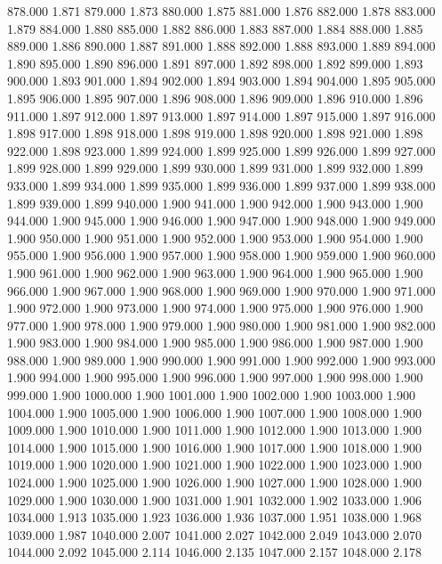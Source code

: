 878.000 1.871 
879.000 1.873 
880.000 1.875 
881.000 1.876 
882.000 1.878 
883.000 1.879 
884.000 1.880 
885.000 1.882 
886.000 1.883 
887.000 1.884 
888.000 1.885 
889.000 1.886 
890.000 1.887 
891.000 1.888 
892.000 1.888 
893.000 1.889 
894.000 1.890 
895.000 1.890 
896.000 1.891 
897.000 1.892 
898.000 1.892 
899.000 1.893 
900.000 1.893 
901.000 1.894 
902.000 1.894 
903.000 1.894 
904.000 1.895 
905.000 1.895 
906.000 1.895 
907.000 1.896 
908.000 1.896 
909.000 1.896 
910.000 1.896 
911.000 1.897 
912.000 1.897 
913.000 1.897 
914.000 1.897 
915.000 1.897 
916.000 1.898 
917.000 1.898 
918.000 1.898 
919.000 1.898 
920.000 1.898 
921.000 1.898 
922.000 1.898 
923.000 1.899 
924.000 1.899 
925.000 1.899 
926.000 1.899 
927.000 1.899 
928.000 1.899 
929.000 1.899 
930.000 1.899 
931.000 1.899 
932.000 1.899 
933.000 1.899 
934.000 1.899 
935.000 1.899 
936.000 1.899 
937.000 1.899 
938.000 1.899 
939.000 1.899 
940.000 1.900 
941.000 1.900 
942.000 1.900 
943.000 1.900 
944.000 1.900 
945.000 1.900 
946.000 1.900 
947.000 1.900 
948.000 1.900 
949.000 1.900 
950.000 1.900 
951.000 1.900 
952.000 1.900 
953.000 1.900 
954.000 1.900 
955.000 1.900 
956.000 1.900 
957.000 1.900 
958.000 1.900 
959.000 1.900 
960.000 1.900 
961.000 1.900 
962.000 1.900 
963.000 1.900 
964.000 1.900 
965.000 1.900 
966.000 1.900 
967.000 1.900 
968.000 1.900 
969.000 1.900 
970.000 1.900 
971.000 1.900 
972.000 1.900 
973.000 1.900 
974.000 1.900 
975.000 1.900 
976.000 1.900 
977.000 1.900 
978.000 1.900 
979.000 1.900 
980.000 1.900 
981.000 1.900 
982.000 1.900 
983.000 1.900 
984.000 1.900 
985.000 1.900 
986.000 1.900 
987.000 1.900 
988.000 1.900 
989.000 1.900 
990.000 1.900 
991.000 1.900 
992.000 1.900 
993.000 1.900 
994.000 1.900 
995.000 1.900 
996.000 1.900 
997.000 1.900 
998.000 1.900 
999.000 1.900 
1000.000 1.900 
1001.000 1.900 
1002.000 1.900 
1003.000 1.900 
1004.000 1.900 
1005.000 1.900 
1006.000 1.900 
1007.000 1.900 
1008.000 1.900 
1009.000 1.900 
1010.000 1.900 
1011.000 1.900 
1012.000 1.900 
1013.000 1.900 
1014.000 1.900 
1015.000 1.900 
1016.000 1.900 
1017.000 1.900 
1018.000 1.900 
1019.000 1.900 
1020.000 1.900 
1021.000 1.900 
1022.000 1.900 
1023.000 1.900 
1024.000 1.900 
1025.000 1.900 
1026.000 1.900 
1027.000 1.900 
1028.000 1.900 
1029.000 1.900 
1030.000 1.900 
1031.000 1.901 
1032.000 1.902 
1033.000 1.906 
1034.000 1.913 
1035.000 1.923 
1036.000 1.936 
1037.000 1.951 
1038.000 1.968 
1039.000 1.987 
1040.000 2.007 
1041.000 2.027 
1042.000 2.049 
1043.000 2.070 
1044.000 2.092 
1045.000 2.114 
1046.000 2.135 
1047.000 2.157 
1048.000 2.178 
